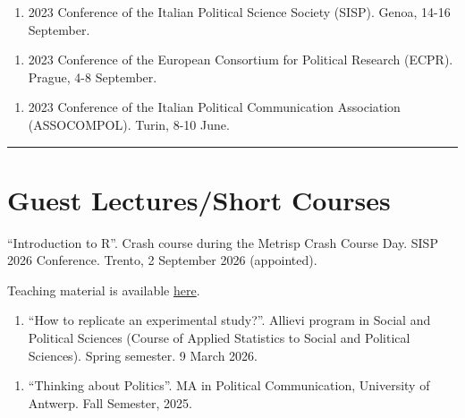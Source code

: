 \documentclass[10pt,]{article}
\providecommand{\tightlist}{%
  \setlength{\itemsep}{0pt}\setlength{\parskip}{0pt}}
\renewenvironment{itemize}{
  \begin{list}{}{
    \setlength{\leftmargin}{1.5em}
  }
}{
  \end{list}
}
\begin{document}
\begin{enumerate}
\def\labelenumi{\arabic{enumi}.}
\setcounter{enumi}{2}
\tightlist
\item
  2023 Conference of the Italian Political Science Society (SISP).
  Genoa, 14-16 September.
\end{enumerate}

\begin{enumerate}
\def\labelenumi{\arabic{enumi}.}
\setcounter{enumi}{1}
\tightlist
\item
  2023 Conference of the European Consortium for Political Research
  (ECPR). Prague, 4-8 September.
\end{enumerate}

\begin{enumerate}
\def\labelenumi{\arabic{enumi}.}
\tightlist
\item
  2023 Conference of the Italian Political Communication Association
  (ASSOCOMPOL). Turin, 8-10 June.
\end{enumerate}

\bigskip \hrule

\section{Guest Lectures/Short
Courses}\label{guest-lecturesshort-courses}

\begin{enumerate}
\def\labelenumi{\arabic{enumi}.}
\setcounter{enumi}{6}
\tightlist
\item
  ``Introduction to R''. Crash course during the Metrisp Crash Course
  Day. SISP 2026 Conference. Trento, 2 September 2026 (appointed).

  \begin{itemize}
  \tightlist
  \item
    Teaching material is available
    \href{https://github.com/gaetanoscaduto/Crash_Course_R}{here}.
  \end{itemize}
\end{enumerate}

\begin{enumerate}
\def\labelenumi{\arabic{enumi}.}
\setcounter{enumi}{5}
\tightlist
\item
  ``How to replicate an experimental study?''. Allievi program in Social
  and Political Sciences (Course of Applied Statistics to Social and
  Political Sciences). Spring semester. 9 March 2026.
\end{enumerate}

\begin{enumerate}
\def\labelenumi{\arabic{enumi}.}
\setcounter{enumi}{4}
\tightlist
\item
  ``Thinking about Politics''. MA in Political Communication, University
  of Antwerp. Fall Semester, 2025.
\end{enumerate}
\end{document}

